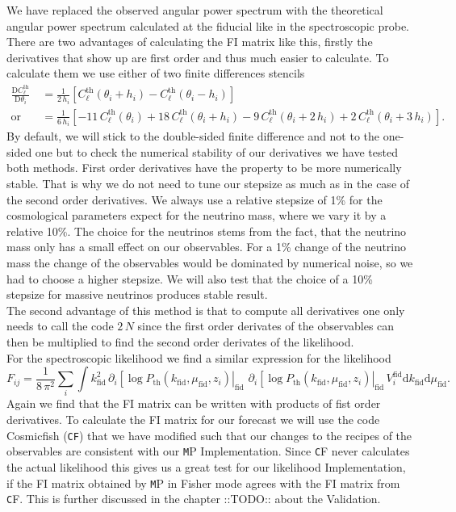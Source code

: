 \documentclass[oneside]{book}
\newcommand*{\rd}{\mathrm{d}}
\newcommand*{\rD}{\mathrm{D}}
\newcommand*{\marktodo}{{\color{mmcol} ::TODO::}\xspace}
\newcommand*{\montepython}{\texttt MP\xspace}
\newcommand*{\cosmicfish}{\texttt CF\xspace}
\begin{document}
We have replaced the observed angular power spectrum with the theoretical angular power spectrum calculated at the fiducial like in the spectroscopic probe. There are two advantages of calculating the FI matrix like this, firstly the derivatives that show up are first order and thus much easier to calculate. To calculate them we use either of two finite differences stencils 
\begin{align}
\frac{\rD C^\mathrm{th}_\ell}{\rD \theta_i} &= \frac{1}{2\,h_i}\left[C^\mathrm{th}_\ell(\theta_i+h_i)-C^\mathrm{th}_\ell(\theta_i-h_i)\right]\\
\text{or}\quad&= \frac{1}{6\,h_i}\left[-11\,C^\mathrm{th}_\ell(\theta_i)+18\,C^\mathrm{th}_\ell(\theta_i+h_i)-9\,C^\mathrm{th}_\ell(\theta_i+2\,h_i)+2\,C^\mathrm{th}_\ell(\theta_i+3\,h_i)\right].
\end{align}
By default, we will stick to the double-sided finite difference and not to the one-sided one but to check the numerical stability of our derivatives we have tested both methods. First order derivatives have the property to be more numerically stable. That is why we do not need to tune our stepsize as much as in the case of the second order derivatives. We always use a relative stepsize of 1\% for the cosmological parameters expect for the neutrino mass, where we vary it by a relative 10\%. The choice for the neutrinos stems from the fact, that the neutrino mass only has a small effect on our observables. For a 1\% change of the neutrino mass the change of the observables would be dominated by numerical noise, so we had to choose a higher stepsize. We will also test that the choice of a 10\% stepsize for massive neutrinos produces stable result.\\
The second advantage of this method is that to compute all derivatives one only needs to call the code $2\,N$ since the first order derivates of the observables can then be multiplied to find the second order derivates of the likelihood.\\
For the spectroscopic likelihood we find a similar expression for the likelihood \begin{equation}
    F_{ij} = \frac{1}{8\,\pi^2}\sum_i \int k_\mathrm{fid}^2 \,\partial_i \left[\log P_\mathrm{th}(k_\mathrm{fid},\mu_\mathrm{fid},z_i) \right|_\mathrm{fid}\,\,\partial_i \left[\log P_\mathrm{th}(k_\mathrm{fid},\mu_\mathrm{fid},z_i)\right|_\mathrm{fid}\,V_i^\mathrm{fid} \rd k_\mathrm{fid} \rd \mu_\mathrm{fid}  .
\end{equation}
Again we find that the FI matrix can be written with products of fist order derivatives. To calculate the FI matrix for our forecast we will use the code Cosmicfish ({\tt CF}) that we have modified such that our changes to the recipes of the observables are consistent with our \montepython Implementation. Since \cosmicfish never calculates the actual likelihood this gives us a great test for our likelihood Implementation, if the FI matrix obtained by \montepython in Fisher mode agrees with the FI matrix from \cosmicfish. This is further discussed in the chapter \marktodo about the Validation.\\
\end{document}
